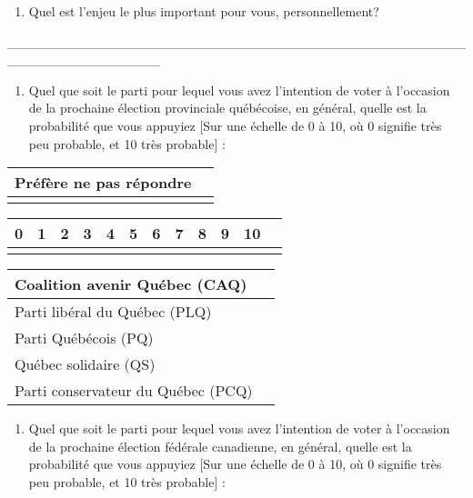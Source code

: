 \documentclass[
  letterpaper,
  DIV=11,
  numbers=noendperiod]{scrreprt}
\providecommand{\tightlist}{%
  \setlength{\itemsep}{0pt}\setlength{\parskip}{0pt}}\usepackage{longtable,booktabs,array}
\begin{document}
\begin{enumerate}
\def\labelenumi{\arabic{enumi}.}
\setcounter{enumi}{15}
\tightlist
\item
  Quel est l'enjeu le plus important pour vous, personnellement?
\end{enumerate}

\_\_\_\_\_\_\_\_\_\_\_\_\_\_\_\_\_\_\_\_\_\_\_\_\_\_\_\_\_\_\_\_\_\_\_\_\_\_\_\_\_\_\_\_\_\_\_\_\_\_\_\_\_\_\_\_\_\_\_\_\_\_\_\_

\begin{enumerate}
\def\labelenumi{\arabic{enumi}.}
\setcounter{enumi}{16}
\tightlist
\item
  Quel que soit le parti pour lequel vous avez l'intention de voter à
  l'occasion de la prochaine élection provinciale québécoise, en
  général, quelle est la probabilité que vous appuyiez {[}Sur une
  échelle de 0 à 10, où 0 signifie très peu probable, et 10 très
  probable{]} :
\end{enumerate}

\begin{longtable}[]{@{}ll@{}}
\toprule\noalign{}
Préfère ne pas répondre & \\
\midrule\noalign{}
\endhead
\bottomrule\noalign{}
\endlastfoot
\end{longtable}

\begin{longtable}[]{@{}llllllllllll@{}}
\toprule\noalign{}
0 & 1 & 2 & 3 & 4 & 5 & 6 & 7 & 8 & 9 & 10 & \\
\midrule\noalign{}
\endhead
\bottomrule\noalign{}
\endlastfoot
\end{longtable}

\begin{longtable}[]{@{}ll@{}}
\toprule\noalign{}
Coalition avenir Québec (CAQ) & \\
\midrule\noalign{}
\endhead
\bottomrule\noalign{}
\endlastfoot
Parti libéral du Québec (PLQ) & \\
Parti Québécois (PQ) & \\
Québec solidaire (QS) & \\
Parti conservateur du Québec (PCQ) & \\
\end{longtable}

\begin{enumerate}
\def\labelenumi{\arabic{enumi}.}
\setcounter{enumi}{17}
\tightlist
\item
  Quel que soit le parti pour lequel vous avez l'intention de voter à
  l'occasion de la prochaine élection fédérale canadienne, en général,
  quelle est la probabilité que vous appuyiez {[}Sur une échelle de 0 à
  10, où 0 signifie très peu probable, et 10 très probable{]} :
\end{enumerate}
\end{document}
